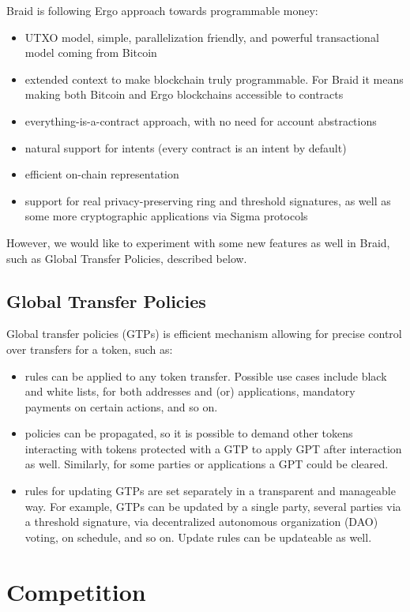 \documentclass{llncs}   %
\newcommand{\bc}{Braid}
\begin{document}
\bc{} is following Ergo approach towards programmable money:
\begin{itemize}
  \item UTXO model, simple, parallelization friendly, and powerful transactional model coming from Bitcoin
  \item extended context to make blockchain truly programmable. For \bc{} it means making both Bitcoin and Ergo
  blockchains accessible to contracts
  \item everything-is-a-contract approach, with no need for account abstractions
  \item natural support for intents (every contract is an intent by default)
  \item efficient on-chain representation
  \item support for real privacy-preserving ring and threshold signatures, as well as some more cryptographic
  applications via Sigma protocols
\end{itemize}

However, we would like to experiment with some new features as well in \bc{}, such as Global Transfer Policies,
described below.

\subsection{Global Transfer Policies}

Global transfer policies (GTPs) is efficient mechanism allowing for precise control over transfers for a token, such as:
\begin{itemize}
  \item rules can be applied to any token transfer. Possible use cases include black and white lists, for both addresses
  and (or) applications, mandatory payments on certain actions, and so on.
  \item policies can be propagated, so it is possible to demand other tokens interacting with tokens protected with a GTP to
  apply GPT after interaction as well. Similarly, for some parties or applications a GPT could be cleared.
  \item rules for updating GTPs are set separately in a transparent and manageable way. For example, GTPs can be updated
  by a single party, several parties via a threshold signature, via decentralized autonomous organization (DAO) voting,
  on schedule, and so on. Update rules can be updateable as well.
\end{itemize}

\section{Competition}
\label{sec-competition}
\end{document}
